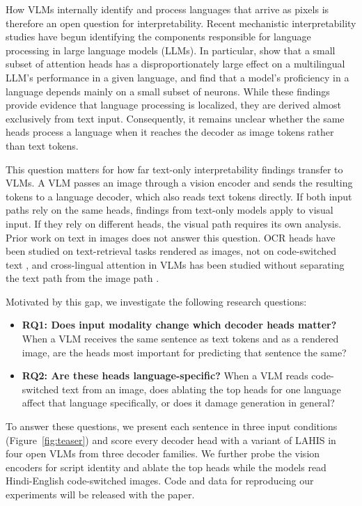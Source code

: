 \documentclass[10pt]{article}
\begin{document}
How VLMs internally identify and process languages that arrive as pixels is therefore an open question for interpretability. Recent mechanistic interpretability studies have begun identifying the components responsible for language processing in large language models (LLMs). In particular, \citet{liu2026lahis} show that a small subset of attention heads has a disproportionately large effect on a multilingual LLM's performance in a given language, and \citet{tang2024neurons} find that a model's proficiency in a language depends mainly on a small subset of neurons. While these findings provide evidence that language processing is localized, they are derived almost exclusively from text input. Consequently, it remains unclear whether the same heads process a language when it reaches the decoder as image tokens rather than text tokens.

This question matters for how far text-only interpretability findings transfer to VLMs. A VLM passes an image through a vision encoder and sends the resulting tokens to a language decoder, which also reads text tokens directly. If both input paths rely on the same heads, findings from text-only models apply to visual input. If they rely on different heads, the visual path requires its own analysis. Prior work on text in images does not answer this question. OCR heads have been studied on text-retrieval tasks rendered as images, not on code-switched text \citep{baek2025ocr}, and cross-lingual attention in VLMs has been studied without separating the text path from the image path \citep{ye2025claim}.

Motivated by this gap, we investigate the following research questions:
\begin{itemize}
    \item \textbf{RQ1: Does input modality change which decoder heads matter?} When a VLM receives the same sentence as text tokens and as a rendered image, are the heads most important for predicting that sentence the same?
    \item \textbf{RQ2: Are these heads language-specific?} When a VLM reads code-switched text from an image, does ablating the top heads for one language affect that language specifically, or does it damage generation in general?
\end{itemize}

To answer these questions, we present each sentence in three input conditions (Figure~\ref{fig:teaser}) and score every decoder head with a variant of LAHIS \citep{liu2026lahis} in four open VLMs from three decoder families. We further probe the vision encoders for script identity and ablate the top heads while the models read Hindi-English code-switched images. Code and data for reproducing our experiments will be released with the paper.
\end{document}
